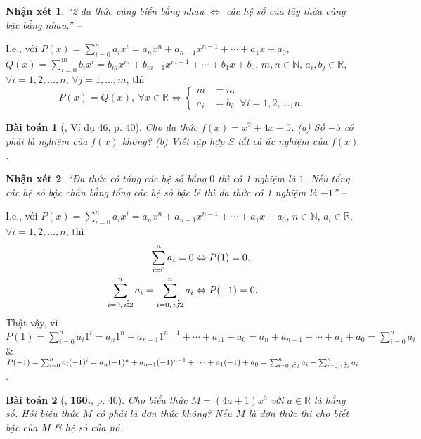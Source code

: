 \documentclass{article}
\numberwithin{equation}{section}
\newtheorem{baitoan}{Bài toán}
\newtheorem{nhanxet}{Nhận xét}[section]
\DeclareRobustCommand{\divby}{%
	\mathrel{\vbox{\baselineskip.65ex\lineskiplimit0pt\hbox{.}\hbox{.}\hbox{.}}}%
}
\begin{document}
\begin{nhanxet}
	``2 đa thức cùng biến bằng nhau $\Leftrightarrow$ các hệ số của lũy thừa cùng bậc bằng nhau.'' -- \cite[p. 40]{Tuyen_Toan_7}
\end{nhanxet}
I.e., với $P(x) = \sum_{i=0}^n a_ix^i = a_nx^n + a_{n-1}x^{n-1} + \cdots + a_1x + a_0$, $Q(x) = \sum_{i=0}^m b_ix^i = b_mx^m + b_{m-1}x^{m-1} + \cdots + b_1x + b_0$, $m,n\in\mathbb{N}$, $a_i,b_j\in\mathbb{R}$, $\forall i = 1,2,\ldots,n$, $\forall j = 1,\ldots,m$, thì
\begin{equation*}
	P(x) = Q(x),\ \forall x\in\mathbb{R}\Leftrightarrow\left\{\begin{split}
		m &= n,\\
		a_i &= b_i,\ \forall i = 1,2,\ldots,n.
	\end{split}\right.
\end{equation*}

\begin{baitoan}[\cite{Tuyen_Toan_7}, Ví dụ 46, p. 40]
	Cho đa thức $f(x) = x^2 + 4x - 5$. (a) Số $-5$ có phải là nghiệm của $f(x)$ không? (b) Viết tập hợp $S$ tất cả ác nghiệm của $f(x)$.
\end{baitoan}

\begin{nhanxet}
	``Đa thức có tổng các hệ số bằng $0$ thì có 1 nghiệm là $1$. Nếu tổng các hệ số bậc chẵn bằng tổng các hệ số bậc lẻ thì đa thức có 1 nghiệm là $-1$'' -- \cite[p. 40]{Tuyen_Toan_7}
\end{nhanxet}
I.e., với $P(x) = \sum_{i=0}^n a_ix^i = a_nx^n + a_{n-1}x^{n-1} + \cdots + a_1x + a_0$, $n\in\mathbb{N}$, $a_i\in\mathbb{R}$, $\forall i = 1,2,\ldots,n$, thì
\begin{align*}
	\sum_{i=0}^n a_i = 0&\Leftrightarrow P(1) = 0,\\
	\sum_{i=0,\,i\divby 2}^n a_i = \sum_{i=0,\,i\not\,\divby 2}^n a_i&\Leftrightarrow P(-1) = 0.
\end{align*}
Thật vậy, vì $P(1) = \sum_{i=0}^n a_i1^i = a_n1^n + a_{n-1}1^{n-1} + \cdots + a_11 + a_0 = a_n + a_{n-1} + \cdots + a_1 + a_0 = \sum_{i=0}^n a_i$ \& $P(-1) = \sum_{i=0}^n a_i(-1)^i = a_n(-1)^n + a_{n-1}(-1)^{n-1} + \cdots + a_1(-1) + a_0 = \sum_{i=0,\,i\divby 2}^n a_i - \sum_{i=0,\,i\not\,\divby 2}^n a_i$.

\begin{baitoan}[\cite{Tuyen_Toan_7}, \textbf{160.}, p. 40]
	Cho biểu thức $M = (4a + 1)x^3$ với $a\in\mathbb{R}$ là hằng số. Hỏi biểu thức $M$ có phải là đơn thức không? Nếu $M$ là đơn thức thì cho biết bậc của $M$ \& hệ số của nó.
\end{baitoan}
\end{document}

